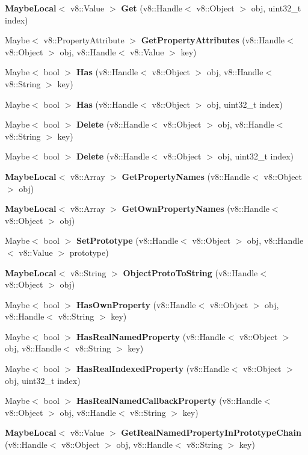 \begin{DoxyCompactItemize}
\item 
\textbf{ Maybe\+Local}$<$ v8\+::\+Value $>$ \textbf{ Get} (v8\+::\+Handle$<$ v8\+::\+Object $>$ obj, uint32\+\_\+t index)
\item 
Maybe$<$ v8\+::\+Property\+Attribute $>$ \textbf{ Get\+Property\+Attributes} (v8\+::\+Handle$<$ v8\+::\+Object $>$ obj, v8\+::\+Handle$<$ v8\+::\+Value $>$ key)
\item 
Maybe$<$ bool $>$ \textbf{ Has} (v8\+::\+Handle$<$ v8\+::\+Object $>$ obj, v8\+::\+Handle$<$ v8\+::\+String $>$ key)
\item 
Maybe$<$ bool $>$ \textbf{ Has} (v8\+::\+Handle$<$ v8\+::\+Object $>$ obj, uint32\+\_\+t index)
\item 
Maybe$<$ bool $>$ \textbf{ Delete} (v8\+::\+Handle$<$ v8\+::\+Object $>$ obj, v8\+::\+Handle$<$ v8\+::\+String $>$ key)
\item 
Maybe$<$ bool $>$ \textbf{ Delete} (v8\+::\+Handle$<$ v8\+::\+Object $>$ obj, uint32\+\_\+t index)
\item 
\textbf{ Maybe\+Local}$<$ v8\+::\+Array $>$ \textbf{ Get\+Property\+Names} (v8\+::\+Handle$<$ v8\+::\+Object $>$ obj)
\item 
\textbf{ Maybe\+Local}$<$ v8\+::\+Array $>$ \textbf{ Get\+Own\+Property\+Names} (v8\+::\+Handle$<$ v8\+::\+Object $>$ obj)
\item 
Maybe$<$ bool $>$ \textbf{ Set\+Prototype} (v8\+::\+Handle$<$ v8\+::\+Object $>$ obj, v8\+::\+Handle$<$ v8\+::\+Value $>$ prototype)
\item 
\textbf{ Maybe\+Local}$<$ v8\+::\+String $>$ \textbf{ Object\+Proto\+To\+String} (v8\+::\+Handle$<$ v8\+::\+Object $>$ obj)
\item 
Maybe$<$ bool $>$ \textbf{ Has\+Own\+Property} (v8\+::\+Handle$<$ v8\+::\+Object $>$ obj, v8\+::\+Handle$<$ v8\+::\+String $>$ key)
\item 
Maybe$<$ bool $>$ \textbf{ Has\+Real\+Named\+Property} (v8\+::\+Handle$<$ v8\+::\+Object $>$ obj, v8\+::\+Handle$<$ v8\+::\+String $>$ key)
\item 
Maybe$<$ bool $>$ \textbf{ Has\+Real\+Indexed\+Property} (v8\+::\+Handle$<$ v8\+::\+Object $>$ obj, uint32\+\_\+t index)
\item 
Maybe$<$ bool $>$ \textbf{ Has\+Real\+Named\+Callback\+Property} (v8\+::\+Handle$<$ v8\+::\+Object $>$ obj, v8\+::\+Handle$<$ v8\+::\+String $>$ key)
\item 
\textbf{ Maybe\+Local}$<$ v8\+::\+Value $>$ \textbf{ Get\+Real\+Named\+Property\+In\+Prototype\+Chain} (v8\+::\+Handle$<$ v8\+::\+Object $>$ obj, v8\+::\+Handle$<$ v8\+::\+String $>$ key)

\end{DoxyCompactItemize}
